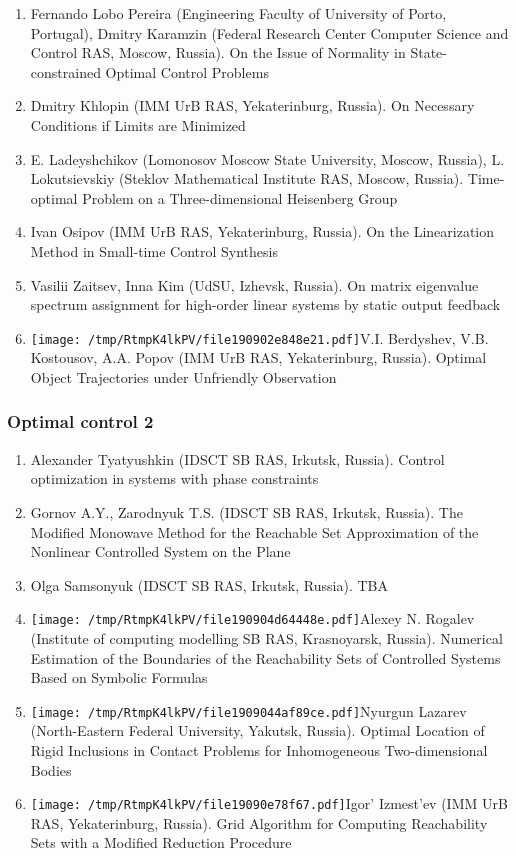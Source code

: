 \documentclass[
]{article}
\providecommand{\tightlist}{%
  \setlength{\itemsep}{0pt}\setlength{\parskip}{0pt}}
\begin{document}
\begin{enumerate}
\def\labelenumi{\arabic{enumi}.}
\tightlist
\item
  Fernando Lobo Pereira (Engineering Faculty of University of Porto,
  Portugal), Dmitry Karamzin (Federal Research Center Computer Science
  and Control RAS, Moscow, Russia). On the Issue of Normality in
  State-constrained Optimal Control Problems
\item
  Dmitry Khlopin (IMM UrB RAS, Yekaterinburg, Russia). On Necessary
  Conditions if Limits are Minimized
\item
  E. Ladeyshchikov (Lomonosov Moscow State University, Moscow, Russia),
  L. Lokutsievskiy (Steklov Mathematical Institute RAS, Moscow, Russia).
  Time-optimal Problem on a Three-dimensional Heisenberg Group
\item
  Ivan Osipov (IMM UrB RAS, Yekaterinburg, Russia). On the Linearization
  Method in Small-time Control Synthesis
\item
  Vasilii Zaitsev, Inna Kim (UdSU, Izhevsk, Russia). On matrix
  eigenvalue spectrum assignment for high-order linear systems by static
  output feedback
\item
  \protect\texttt{[image: /tmp/RtmpK4lkPV/file190902e848e21.pdf]}V.I.
  Berdyshev, V.B. Kostousov, A.A. Popov (IMM UrB RAS, Yekaterinburg,
  Russia). Optimal Object Trajectories under Unfriendly Observation
\end{enumerate}

\hypertarget{oc2}{%
\subsubsection{Optimal control 2}\label{oc2}}

\begin{enumerate}
\def\labelenumi{\arabic{enumi}.}
\tightlist
\item
  Alexander Tyatyushkin (IDSCT SB RAS, Irkutsk, Russia). Control
  optimization in systems with phase constraints
\item
  Gornov A.Y., Zarodnyuk T.S. (IDSCT SB RAS, Irkutsk, Russia). The
  Modiﬁed Monowave Method for the Reachable Set Approximation of the
  Nonlinear Controlled System on the Plane
\item
  Olga Samsonyuk (IDSCT SB RAS, Irkutsk, Russia). TBA
\item
  \protect\texttt{[image: /tmp/RtmpK4lkPV/file190904d64448e.pdf]}Alexey
  N. Rogalev (Institute of computing modelling SB RAS, Krasnoyarsk,
  Russia). Numerical Estimation of the Boundaries of the Reachability
  Sets of Controlled Systems Based on Symbolic Formulas
\item
  \protect\texttt{[image: /tmp/RtmpK4lkPV/file1909044af89ce.pdf]}Nyurgun
  Lazarev (North-Eastern Federal University, Yakutsk, Russia). Optimal
  Location of Rigid Inclusions in Contact Problems for Inhomogeneous
  Two-dimensional Bodies
\item
  \protect\texttt{[image: /tmp/RtmpK4lkPV/file19090e78f67.pdf]}Igor'
  Izmest'ev (IMM UrB RAS, Yekaterinburg, Russia). Grid Algorithm for
  Computing Reachability Sets with a Modified Reduction Procedure
\end{enumerate}
\end{document}
